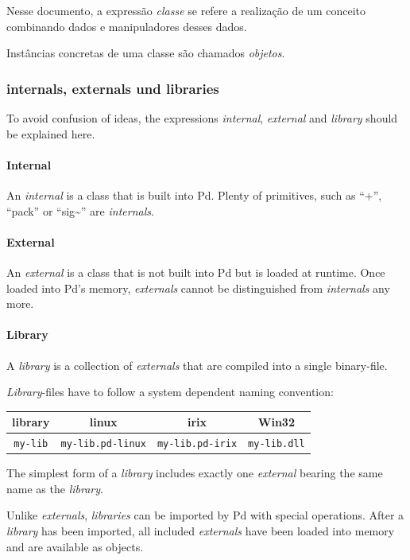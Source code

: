 \documentclass{ppgmus}
\begin{document}
Nesse documento, a expressão {\em classe} se refere a realização de um
conceito combinando dados e manipuladores desses dados.

Instâncias concretas de uma classe são chamados {\em objetos}.

\subsubsection{internals, externals und libraries}

To avoid confusion of ideas, the expressions {\em internal}, {\em external} and
{\em library} should be explained here.

\paragraph{Internal}
An {\em internal} is a class that is built into Pd.
Plenty of primitives, such as ``+'', ``pack'' or ``sig\~\/'' are {\em internals}.

\paragraph{External}
An {\em external} is a class that is not built into Pd but is loaded at runtime.
Once loaded into Pd's memory, {\em externals} cannot be distinguished from
{\em internals} any more.

\paragraph{Library}
A {\em library} is a collection of {\em externals} that are compiled into a 
single binary-file.

{\em Library}-files have to follow a system dependent naming convention:

\begin{tabular}{c||c|c|c}
library & linux&irix&Win32 \\
\hline
{\tt my-lib}&{\tt  my-lib.pd-linux}&{\tt  my-lib.pd-irix}&
{\tt  my-lib.dll}\\
\end{tabular}

The simplest form of a {\em library} includes exactly one {\em external}
bearing the same name as the {\em library}.

Unlike {\em externals}, {\em libraries} can be imported by Pd with special operations.
After a {\em library} has been imported,
all included {\em externals} have been loaded into memory and are available as objects.
\end{document}
